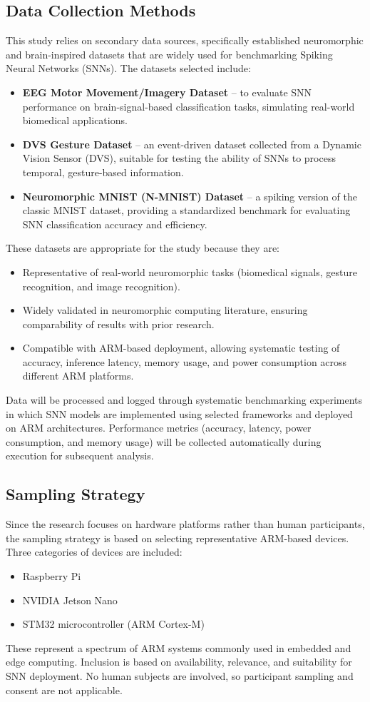 \documentclass[a4paper,12pt]{article}
\begin{document}
	\subsection{Data Collection Methods}
	This study relies on secondary data sources, specifically established neuromorphic and brain-inspired datasets that are widely used for benchmarking Spiking Neural Networks (SNNs). The datasets selected include:
	\begin{itemize}
		\item \textbf{EEG Motor Movement/Imagery Dataset} – to evaluate SNN performance on brain-signal-based classification tasks, simulating real-world biomedical applications.
		\item \textbf{DVS Gesture Dataset} – an event-driven dataset collected from a Dynamic Vision Sensor (DVS), suitable for testing the ability of SNNs to process temporal, gesture-based information.
		\item \textbf{Neuromorphic MNIST (N-MNIST) Dataset} – a spiking version of the classic MNIST dataset, providing a standardized benchmark for evaluating SNN classification accuracy and efficiency.
	\end{itemize}
	These datasets are appropriate for the study because they are:
	\begin{itemize}
		\item Representative of real-world neuromorphic tasks (biomedical signals, gesture recognition, and image recognition).
		\item Widely validated in neuromorphic computing literature, ensuring comparability of results with prior research.
		\item Compatible with ARM-based deployment, allowing systematic testing of accuracy, inference latency, memory usage, and power consumption across different ARM platforms.
	\end{itemize}
	Data will be processed and logged through systematic benchmarking experiments in which SNN models are implemented using selected frameworks and deployed on ARM architectures. Performance metrics (accuracy, latency, power consumption, and memory usage) will be collected automatically during execution for subsequent analysis.
	
	\subsection{Sampling Strategy}
	Since the research focuses on hardware platforms rather than human participants, the sampling strategy is based on selecting representative ARM-based devices. Three categories of devices are included:
	\begin{itemize}
		\item Raspberry Pi
		\item NVIDIA Jetson Nano
		\item STM32 microcontroller (ARM Cortex-M)
	\end{itemize}
	These represent a spectrum of ARM systems commonly used in embedded and edge computing. Inclusion is based on availability, relevance, and suitability for SNN deployment. No human subjects are involved, so participant sampling and consent are not applicable.
	
\end{document}
